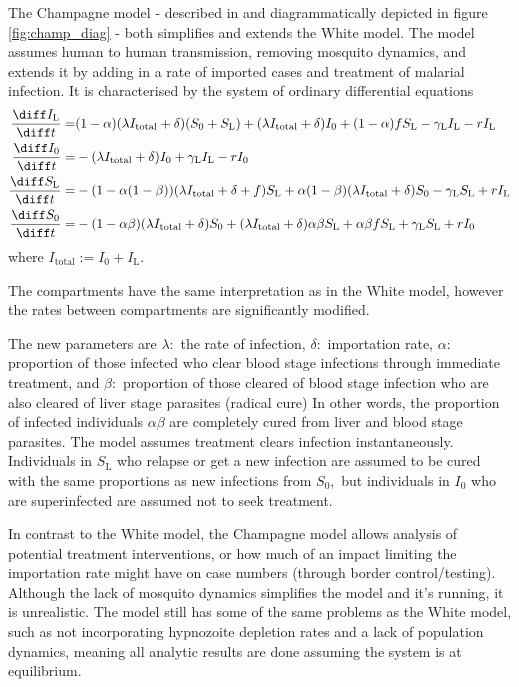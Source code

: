 The Champagne model - described in \parencite{champagne_using_2022} and diagrammatically depicted in figure \ref{fig:champ_diag} - both simplifies and extends the White model. The model assumes human to human transmission, removing mosquito dynamics, and extends it by adding in a rate of imported cases and treatment of malarial infection. It is characterised by the system of ordinary differential equations
\begin{align*}
    \frac{\diff I_\mathrm{L}}{\diff t} = & (1 - \alpha)(\lambda I_\mathrm{total} + \delta)(S_0 + S_\mathrm{L}) + (\lambda I_\mathrm{total} + \delta)I_0 + (1 - \alpha)fS_\mathrm{L} - \gamma_\mathrm{L}I_\mathrm{L} - rI_\mathrm{L}  \\
    \frac{\diff I_0}{\diff t} =          & -(\lambda I_\mathrm{total} + \delta)I_0 + \gamma_\mathrm{L}I_\mathrm{L} - rI_0                                                                                                            \\
    \frac{\diff S_\mathrm{L}}{\diff t} = & -(1 - \alpha(1 - \beta))(\lambda I_\mathrm{total} + \delta + f)S_\mathrm{L} + \alpha(1-\beta)(\lambda I_\mathrm{total} + \delta)S_0 - \gamma_\mathrm{L}S_\mathrm{L} + rI_\mathrm{L}       \\
    \frac{\diff S_0}{\diff t} =          & -(1 - \alpha\beta)(\lambda I_\mathrm{total} + \delta)S_0 + (\lambda I_\mathrm{total} + \delta)\alpha\beta S_\mathrm{L} + \alpha\beta fS_\mathrm{L} + \gamma_\mathrm{L}S_\mathrm{L} + rI_0
\end{align*} where $I_\mathrm{total} := I_0 + I_\mathrm{L}.$

The compartments have the same interpretation as in the White model, however the rates between compartments are significantly modified.

The new parameters are $\lambda:$ the rate of infection,
$\delta:$ importation rate,
$\alpha:$ proportion of those infected who clear blood stage
infections through immediate treatment, and
$\beta:$ proportion of those cleared of blood stage infection who
are also cleared of liver stage parasites (radical cure)
In other words, the proportion of infected individuals $\alpha\beta$ are
completely cured from liver and blood stage parasites. The model assumes
treatment clears infection instantaneously. Individuals in $S_\mathrm{L}$ who
relapse or get a new infection are assumed to be cured with the same
proportions as new infections from $S_0,$ but individuals in $I_0$ who are
superinfected are assumed not to seek treatment.

In contrast to the White model, the Champagne model allows analysis of potential treatment interventions, or how much of an impact limiting the importation rate might have on case numbers (through border control/testing). Although the lack of mosquito dynamics simplifies the model and it's running, it is unrealistic. The model still has some of the same problems as the White model, such as not incorporating hypnozoite depletion rates and a lack of population dynamics, meaning all analytic results are done assuming the system is at equilibrium.